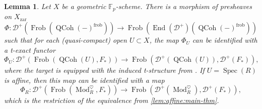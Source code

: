 \documentclass{article}
\theoremstyle{definition}
\theoremstyle{definition}
\theoremstyle{definition}
\theoremstyle{plain}
\newtheorem{lem}[defn]{Lemma}
\theoremstyle{plain}
\theoremstyle{plain}
\theoremstyle{plain}
\theoremstyle{plain}
\theoremstyle{plain}
\theoremstyle{plain}
\theoremstyle{plain}
\theoremstyle{remark}
\theoremstyle{remark}
\theoremstyle{plain}
\theoremstyle{plain}
\theoremstyle{plain}
\theoremstyle{plain}
\theoremstyle{plain}
\newcommand{\Fp}{\mathbb{F}_p}
\newcommand{\ModDisc}[1]{\operatorname{Mod}_{#1}^{\heartsuit}}
\newcommand{\QCoh}[1]{\operatorname{QCoh}(#1)}
\newcommand{\Frob}[2]{\operatorname{Frob}(#1, #2)}
\newcommand{\FrobSingle}[1]{\operatorname{Frob}(#1)}
\newcommand{\End}[1]{\operatorname{End}(#1)}
\newcommand{\Cat}[1]{\mathcal{#1}}
\newcommand{\zar}{\operatorname{zar}}
\newcommand{\frob}{\operatorname{frob}}
\begin{document}
\begin{lem} \label{lem:zariski:canonical-map}
    Let $X$ be a geometric $\Fp$-scheme.
    There is a morphism of presheaves on $X_{\zar}$
    \begin{equation*}
        \Phi \colon \Cat{D}^+(\FrobSingle{\QCoh{-}^{\frob}}) \to \FrobSingle{\End{\Cat{D}^+}(\QCoh{-}^{\frob})}
    \end{equation*}
    such that for each (quasi-compact) open $U \subset X$,
    the map $\Phi_U$ can be identified with a t-exact functor
    \begin{equation*}
        \Phi_U \colon \Cat{D}^+(\Frob{\QCoh{U}}{F_*}) \to \Frob{\Cat D^+(\QCoh{U})}{\Cat D^+(F_*)},
    \end{equation*}
    where the target is equipped with the induced t-structure from \cite[Proposition 3.3]{cartmod}.
    If $U = \operatorname{Spec}(R)$ is affine, then this map can be identified with a map
    \begin{equation*}
        \Phi_R \colon \Cat{D}^+(\Frob{\ModDisc{R}}{F_*}) \to \Frob{\Cat D^+(\ModDisc{R})}{\Cat D^+(F_*)},
    \end{equation*}
    which is the restriction of the equivalence from \cref{lem:affine:main-thm}.
\end{lem}
\end{document}
